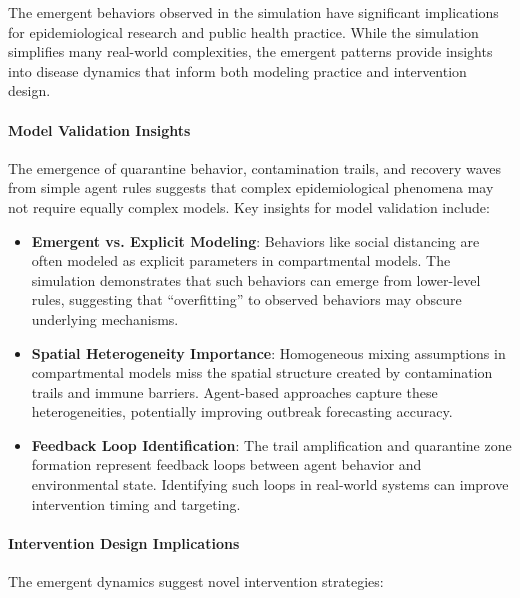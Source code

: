 The emergent behaviors observed in the simulation have significant implications for epidemiological research and public health practice. While the simulation simplifies many real-world complexities, the emergent patterns provide insights into disease dynamics that inform both modeling practice and intervention design.

\paragraph{Model Validation Insights}

The emergence of quarantine behavior, contamination trails, and recovery waves from simple agent rules suggests that complex epidemiological phenomena may not require equally complex models. Key insights for model validation include:

\begin{itemize}
    \item \textbf{Emergent vs. Explicit Modeling}: Behaviors like social distancing are often modeled as explicit parameters in compartmental models. The simulation demonstrates that such behaviors can emerge from lower-level rules, suggesting that ``overfitting'' to observed behaviors may obscure underlying mechanisms.
    
    \item \textbf{Spatial Heterogeneity Importance}: Homogeneous mixing assumptions in compartmental models miss the spatial structure created by contamination trails and immune barriers. Agent-based approaches capture these heterogeneities, potentially improving outbreak forecasting accuracy.
    
    \item \textbf{Feedback Loop Identification}: The trail amplification and quarantine zone formation represent feedback loops between agent behavior and environmental state. Identifying such loops in real-world systems can improve intervention timing and targeting.
\end{itemize}

\paragraph{Intervention Design Implications}

The emergent dynamics suggest novel intervention strategies:

